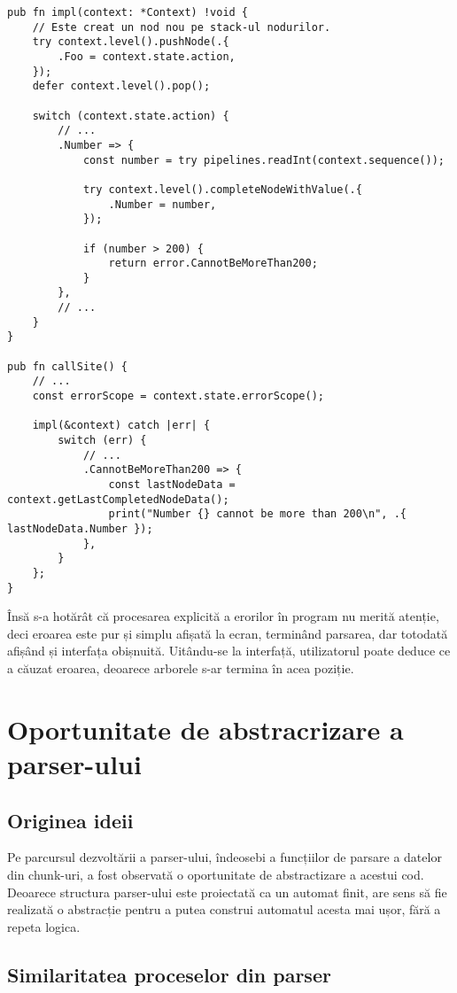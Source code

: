 \documentclass[a4paper,12pt]{report}
\begin{document}
\begin{verbatim}
pub fn impl(context: *Context) !void {
    // Este creat un nod nou pe stack-ul nodurilor.
    try context.level().pushNode(.{
        .Foo = context.state.action,
    });
    defer context.level().pop();

    switch (context.state.action) {
        // ...
        .Number => {
            const number = try pipelines.readInt(context.sequence());

            try context.level().completeNodeWithValue(.{
                .Number = number,
            });

            if (number > 200) {
                return error.CannotBeMoreThan200;
            }
        },
        // ...
    }
}

pub fn callSite() {
    // ... 
    const errorScope = context.state.errorScope();

    impl(&context) catch |err| {
        switch (err) {
            // ...
            .CannotBeMoreThan200 => {
                const lastNodeData = context.getLastCompletedNodeData();
                print("Number {} cannot be more than 200\n", .{ lastNodeData.Number });
            },
        }
    };
}
\end{verbatim}

Însă s-a hotărât că procesarea explicită a erorilor în program nu merită atenție,
deci eroarea este pur și simplu afișată la ecran, terminând parsarea,
dar totodată afișând și interfața obișnuită.
Uitându-se la interfață, utilizatorul poate deduce ce a căuzat eroarea,
deoarece arborele s-ar termina în acea poziție.

\section{Oportunitate de abstracrizare a parser-ului}

\subsection{Originea ideii}

Pe parcursul dezvoltării a parser-ului, îndeosebi a funcțiilor de parsare a datelor din chunk-uri,
a fost observată o oportunitate de abstractizare a acestui cod.
Deoarece structura parser-ului este proiectată ca un automat finit,
are sens să fie realizată o abstracție pentru a putea construi automatul acesta mai ușor,
fără a repeta logica.

\subsection{Similaritatea proceselor din parser}
\end{document}
